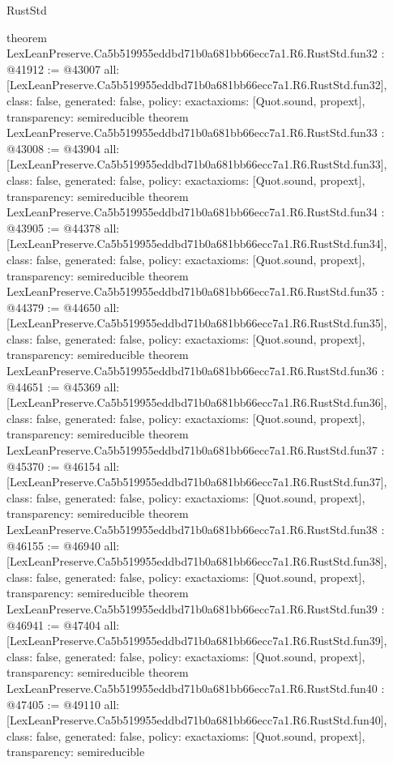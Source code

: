 \begin{lexlean}{RustStd}
\begin{coremodule}
{}
theorem LexLeanPreserve.Ca5b519955eddbd71b0a681bb66ecc7a1.R6.RustStd.fun32 : @41912 := @43007 {
  all: [LexLeanPreserve.Ca5b519955eddbd71b0a681bb66ecc7a1.R6.RustStd.fun32],
  class: false,
  generated: false,
  policy: exact{axioms: [Quot.sound, propext]},
  transparency: semireducible
}
theorem LexLeanPreserve.Ca5b519955eddbd71b0a681bb66ecc7a1.R6.RustStd.fun33 : @43008 := @43904 {
  all: [LexLeanPreserve.Ca5b519955eddbd71b0a681bb66ecc7a1.R6.RustStd.fun33],
  class: false,
  generated: false,
  policy: exact{axioms: [Quot.sound, propext]},
  transparency: semireducible
}
theorem LexLeanPreserve.Ca5b519955eddbd71b0a681bb66ecc7a1.R6.RustStd.fun34 : @43905 := @44378 {
  all: [LexLeanPreserve.Ca5b519955eddbd71b0a681bb66ecc7a1.R6.RustStd.fun34],
  class: false,
  generated: false,
  policy: exact{axioms: [Quot.sound, propext]},
  transparency: semireducible
}
theorem LexLeanPreserve.Ca5b519955eddbd71b0a681bb66ecc7a1.R6.RustStd.fun35 : @44379 := @44650 {
  all: [LexLeanPreserve.Ca5b519955eddbd71b0a681bb66ecc7a1.R6.RustStd.fun35],
  class: false,
  generated: false,
  policy: exact{axioms: [Quot.sound, propext]},
  transparency: semireducible
}
theorem LexLeanPreserve.Ca5b519955eddbd71b0a681bb66ecc7a1.R6.RustStd.fun36 : @44651 := @45369 {
  all: [LexLeanPreserve.Ca5b519955eddbd71b0a681bb66ecc7a1.R6.RustStd.fun36],
  class: false,
  generated: false,
  policy: exact{axioms: [Quot.sound, propext]},
  transparency: semireducible
}
theorem LexLeanPreserve.Ca5b519955eddbd71b0a681bb66ecc7a1.R6.RustStd.fun37 : @45370 := @46154 {
  all: [LexLeanPreserve.Ca5b519955eddbd71b0a681bb66ecc7a1.R6.RustStd.fun37],
  class: false,
  generated: false,
  policy: exact{axioms: [Quot.sound, propext]},
  transparency: semireducible
}
theorem LexLeanPreserve.Ca5b519955eddbd71b0a681bb66ecc7a1.R6.RustStd.fun38 : @46155 := @46940 {
  all: [LexLeanPreserve.Ca5b519955eddbd71b0a681bb66ecc7a1.R6.RustStd.fun38],
  class: false,
  generated: false,
  policy: exact{axioms: [Quot.sound, propext]},
  transparency: semireducible
}
theorem LexLeanPreserve.Ca5b519955eddbd71b0a681bb66ecc7a1.R6.RustStd.fun39 : @46941 := @47404 {
  all: [LexLeanPreserve.Ca5b519955eddbd71b0a681bb66ecc7a1.R6.RustStd.fun39],
  class: false,
  generated: false,
  policy: exact{axioms: [Quot.sound, propext]},
  transparency: semireducible
}
theorem LexLeanPreserve.Ca5b519955eddbd71b0a681bb66ecc7a1.R6.RustStd.fun40 : @47405 := @49110 {
  all: [LexLeanPreserve.Ca5b519955eddbd71b0a681bb66ecc7a1.R6.RustStd.fun40],
  class: false,
  generated: false,
  policy: exact{axioms: [Quot.sound, propext]},
  transparency: semireducible
}
\end{coremodule}
\end{lexlean}
